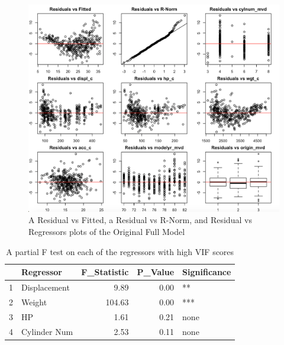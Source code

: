 \documentclass{article}
\begin{document}
\begin{figure}
	\centering
	\includegraphics[width=1\linewidth]{2-10p_resall}
	\caption[Residual Plots of the Original Full Model]
	{A Residual vs Fitted, a Residual vs R-Norm, and Residual vs Regressors plots of the Original Full Model}
\end{figure}

\clearpage
\newpage 

\begin{table}[ht]
\centering
\begin{tabular}{rlrrl}
  \hline
 & Regressor & F\_Statistic & P\_Value & Significance \\ 
  \hline
1 & Displacement & 9.89 & 0.00 & ** \\ 
  2 & Weight & 104.63 & 0.00 & *** \\ 
  3 & HP & 1.61 & 0.21 & none \\ 
  4 & Cylinder Num & 2.53 & 0.11 & none \\ 
   \hline
\end{tabular}
\caption{A partial F test on each of the regressors with high VIF scores}
\label{tab:partialfhighvif}
\end{table}
\end{document}
